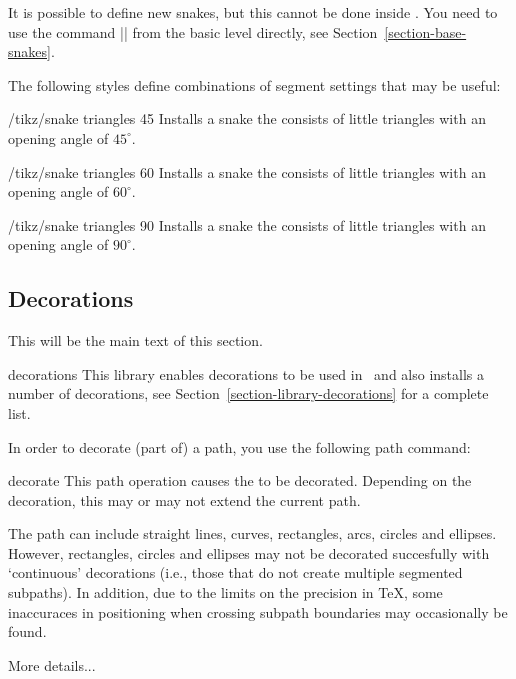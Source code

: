 It is possible to define new snakes, but this cannot be done inside
\tikzname. You need to use the command |\pgfdeclaresnake| from the
basic level directly, see Section~\ref{section-base-snakes}.

The following styles define combinations of segment settings that may
be useful:
\begin{stylekey}{/tikz/snake triangles 45}
  Installs a snake the consists of little triangles with an opening
  angle of $45^\circ$.
\end{stylekey}

\begin{stylekey}{/tikz/snake triangles 60}
  Installs a snake the consists of little triangles with an opening
  angle of $60^\circ$.
\end{stylekey}

\begin{stylekey}{/tikz/snake triangles 90}
  Installs a snake the consists of little triangles with an opening
  angle of $90^\circ$.
\end{stylekey}




\subsection{Decorations}

This will be the main text of this section.


\begin{tikzlibrary}{decorations}
  This library enables decorations to be used in \tikzname\ and also
  installs a number of decorations, see
  Section~\ref{section-library-decorations} for a complete list.
\end{tikzlibrary}

In order to decorate (part of) a path, you use the following path
command:

\begin{pathoperation}{decorate}{}
  This path operation causes the  to be
  decorated. Depending on the decoration, this may or may not extend
  the current path.

  The path can include straight lines, curves,
  rectangles, arcs, circles and ellipses. However, rectangles, circles 
  and ellipses may not be decorated succesfully with `continuous' 
  decorations (i.e., those that do not create multiple segmented 
  subpaths). In addition, due to the limits on the precision in 
  \TeX, some inaccuraces in positioning when crossing subpath 
  boundaries may occasionally be found.
  
  More details...
\end{pathoperation}

